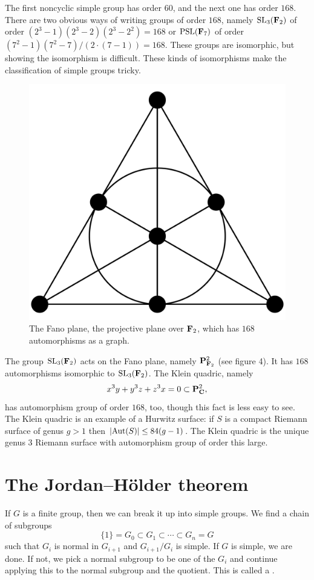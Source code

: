 \documentclass[11pt, oneside]{amsart}
\begin{document}
The first noncyclic simple group has order $60$, and the next one has order $168$. There are two obvious ways of writing groups of order $168$, namely $\operatorname{SL}_3(\mathbf F_2)$ of order $(2^3-1)(2^3 - 2)(2^3 - 2^2) = 168$ or $\operatorname{PSL}(\mathbf F_7)$ of order $(7^2 - 1)(7^2-7)/(2\cdot(7-1)) =168$. These groups are isomorphic, but showing the isomorphism is difficult. These kinds of isomorphisms make the classification of simple groups tricky.
\begin{figure}
\centering
\includegraphics[scale=0.1]{images/fano_plane}
\caption{The Fano plane, the projective plane over $\mathbf F_2$, which has $168$ automorphisms as a graph.}
\end{figure}
The group $\operatorname{SL}_3(\mathbf F_2)$ acts on the Fano plane, namely $\mathbf P^2_{\mathbf F_2}$ (see figure 4). It has $168$ automorphisms isomorphic to $\operatorname{SL}_3(\mathbf F_2)$. The Klein quadric, namely 
$$
x^3y + y^3z + z^3x = 0\subset \mathbf P^2_\mathbf C,
$$
has automorphism group of order $168$, too, though this fact is less easy to see. The Klein quadric is an example of a Hurwitz surface: if $S$ is a compact Riemann surface of genus $g> 1$ then $\left \lvert \operatorname{Aut} (S) \right \rvert \le  84(g-1)$. The Klein quadric is the unique genus $3$ Riemann surface with automorphism group of order this large.

\section{The Jordan--Hölder theorem}
If $G$ is a finite group, then we can break it up into simple groups. We find a chain of subgroups
$$
\{1\} = G_0 \subset G_1 \subset \cdots\subset G_n = G
$$
such that $G_i$ is normal in $G_{i+1}$ and $G_{i+1}/G_i$ is simple. If $G$ is simple, we are done. If not, we pick a normal subgroup to be one of the $G_i$ and continue applying this to the normal subgroup and the quotient. This is called a . 
\end{document}
